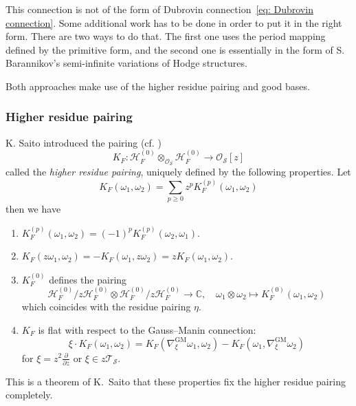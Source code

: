 \documentclass[12pt,a4paper]{amsart}
\newcommand{\CC}{{\mathbb{C}}}
\newcommand{\calS}{{\cal S}}
\def\G{{\mathcal G}}
\def\H{{\mathcal H}}
\def\O{{\mathcal O}}
\def\T{{\mathcal T}}
\renewcommand{\S}{{\mathcal S}}
\def\calS{{\mathcal S}}
\newcommand{\p}{{\partial}}
\newcommand{\<}{\left<}
\renewcommand{\>}{\right>}
\newcommand{\GM}{{\mathrm{GM}}}
\numberwithin{equation}{section}
\begin{document}
This connection is not of the form of Dubrovin connection~\eqref{eq: Dubrovin connection}. Some additional work has to be done in order to put it in the right form. There are two ways to do that. The first one uses the period mapping defined by the primitive form, and the second one is essentially in the form of S. Barannikov's semi-infinite variations of Hodge structures.

Both approaches make use of the higher residue pairing and good bases.


\subsubsection{Higher residue pairing}\label{section: higher residue pairing}
K. Saito introduced the pairing (cf. \cite{SK2})
\[
   K_F: \H_F^{(0)}\otimes_{\O_\S} \H_F^{(0)}\to \O_\S[z]
\]
called the \textit{higher residue pairing}, uniquely defined by the following properties.
Let
\[
 K_F(\omega_1, \omega_2) = \sum_{p \ge 0} z^p K_F^{(p)}(\omega_1,\omega_2)
\]
then we have
\begin{enumerate}

\item $K_F^{(p)}(\omega_1, \omega_2) = (-1)^p K_F^{(p)}(\omega_2,\omega_1)$.

\item $K_F(z\omega_1, \omega_2) = -K_F(\omega_1, z \omega_2) = zK_F(\omega_1,\omega_2)$.

\item $K_F^{(0)}$ defines the pairing
$$
    \H_F^{(0)}/z  \H_F^{(0)}\otimes  \H_F^{(0)}/z  \H_F^{(0)} \to \CC, \quad \omega_1\otimes \omega_2\mapsto K_F^{(0)}(\omega_1,\omega_2)
$$
which coincides with the residue pairing $\eta$.

\item $K_F$ is flat with respect to the Gauss--Manin connection:
\[
    \xi \cdot K_F (\omega_1,\omega_2) = K_F ( \nabla_\xi^\GM \omega_1,\omega_2) - K_F(\omega_1,\nabla_\xi^\GM \omega_2)
\]
for $\xi = z^2 \frac{\p}{\p z}$ or $\xi \in z \T_\S$.
\end{enumerate}
This is a theorem of K.~Saito that these properties fix the higher residue pairing completely.
\end{document}
